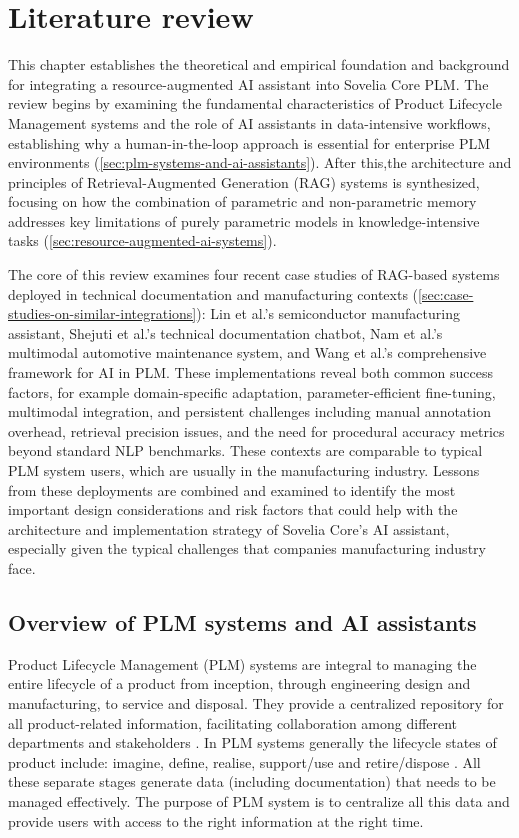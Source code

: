 \chapter{Literature review}
\label{ch:literature-review}

This chapter establishes the theoretical and empirical foundation and background for integrating a resource-augmented AI assistant into Sovelia Core PLM. The review begins by examining the fundamental characteristics of Product Lifecycle Management systems and the role of AI assistants in data-intensive workflows, establishing why a human-in-the-loop approach is essential for enterprise PLM environments (\autoref{sec:plm-systems-and-ai-assistants}). After this,the architecture and principles of Retrieval-Augmented Generation (RAG) systems is synthesized, focusing on how the combination of parametric and non-parametric memory addresses key limitations of purely parametric models in knowledge-intensive tasks (\autoref{sec:resource-augmented-ai-systems}).

The core of this review examines four recent case studies of RAG-based systems deployed in technical documentation and manufacturing contexts (\autoref{sec:case-studies-on-similar-integrations}): Lin et al.'s semiconductor manufacturing assistant, Shejuti et al.'s technical documentation chatbot, Nam et al.'s multimodal automotive maintenance system, and Wang et al.'s comprehensive framework for AI in PLM. These implementations reveal both common success factors, for example domain-specific adaptation, parameter-efficient fine-tuning, multimodal integration, and persistent challenges including manual annotation overhead, retrieval precision issues, and the need for procedural accuracy metrics beyond standard NLP benchmarks. These contexts are comparable to typical PLM system users, which are usually in the manufacturing industry.\parencite{stark_product_2015} Lessons from these deployments are combined and examined to identify the most important design considerations and risk factors that could help with the architecture and implementation strategy of Sovelia Core's AI assistant, especially given the typical challenges that companies manufacturing industry face.

\section{Overview of PLM systems and AI assistants}
\label{sec:plm-systems-and-ai-assistants}

Product Lifecycle Management (PLM) systems are integral to managing the entire lifecycle of a product from inception, through engineering design and manufacturing, to service and disposal. They provide a centralized repository for all product-related information, facilitating collaboration among different departments and stakeholders \parencite{stark_product_2015}. In PLM systems generally the lifecycle states of product include: imagine, define, realise, support/use and retire/dispose \parencite{stark_product_2015-1}. All these separate stages generate data (including documentation) that needs to be managed effectively. The purpose of PLM system is to centralize all this data and provide users with access to the right information at the right time.

